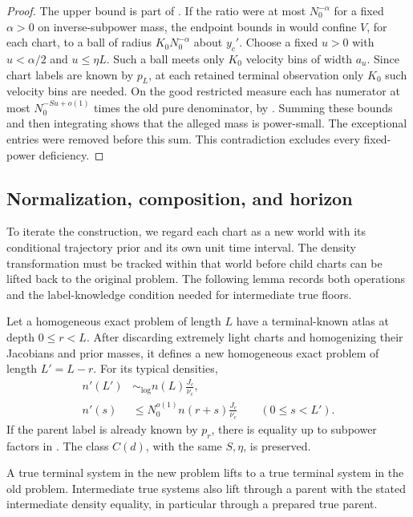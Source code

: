 \begin{proof}
The upper bound is part of .
If the ratio were at most \(N_0^{-\alpha}\) for a fixed
\(\alpha>0\) on inverse-subpower mass, the endpoint bounds
in  would confine \(V\), for each
chart, to a ball of radius \(K_0N_0^{-\alpha}\) about \(y_c'\).
Choose a fixed \(u>0\) with \(u<\alpha/2\) and \(u\le\eta L\).
Such a ball meets only \(K_0\) velocity bins of width \(a_u\).
Since chart labels are known by \(p_L\), at each retained
terminal observation only \(K_0\) such velocity bins are
needed.  On the good restricted measure each has numerator
at most \(N_0^{-Su+o(1)}\) times the old pure denominator,
by .  Summing these bounds and then
integrating shows that the alleged mass is power-small.
The exceptional entries were removed before this sum.
This contradiction excludes every fixed-power deficiency.
\end{proof}

\subsection{Normalization, composition, and horizon}

To iterate the construction, we regard each chart as a new world
with its conditional trajectory prior and its own unit time
interval. The density transformation must be tracked within that
world before child charts can be lifted back to the original
problem. The following lemma records both operations and the
label-knowledge condition needed for intermediate true floors.

\begin{lemma}\label{lem:normalization}
Let a homogeneous exact problem of length \(L\) have a
terminal-known atlas at depth \(0\le r<L\).
After discarding extremely light charts and homogenizing
their Jacobians and prior masses, it defines a new
homogeneous exact problem of length \(L'=L-r\).
For its typical densities,
\begin{align}
 n'(L')&\sim_{\log}
       n(L)\frac{J_c}{\nu_c},
 \label{a01:terminal-normalization}\\
 n'(s)&\le N_0^{o(1)}
       n(r+s)\frac{J_c}{\nu_c}
       \qquad(0\le s<L').
 \label{a01:intermediate-normalization}
\end{align}
If the parent label is already known by \(p_r\), there is
equality up to subpower factors in
.
The class \(C(d)\), with the same \(S,\eta\), is preserved.

A true terminal system in the new problem lifts to a true
terminal system in the old problem.  Intermediate true
systems also lift through a parent with the stated
intermediate density equality, in particular through a
prepared true parent.
\end{lemma}


